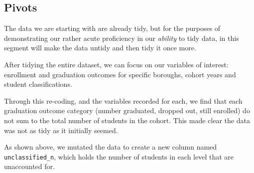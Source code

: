 \documentclass[
  english,
  man, fleqn, noextraspace]{apa6}
\newenvironment{Shaded}{\begin{snugshade}}{\end{snugshade}}
\newcommand{\DataTypeTok}[1]{\textcolor[rgb]{0.13,0.29,0.53}{#1}}
\newcommand{\DecValTok}[1]{\textcolor[rgb]{0.00,0.00,0.81}{#1}}
\newcommand{\KeywordTok}[1]{\textcolor[rgb]{0.13,0.29,0.53}{\textbf{#1}}}
\newcommand{\NormalTok}[1]{#1}
\newcommand{\OperatorTok}[1]{\textcolor[rgb]{0.81,0.36,0.00}{\textbf{#1}}}
\newcommand{\OtherTok}[1]{\textcolor[rgb]{0.56,0.35,0.01}{#1}}
\newcommand{\StringTok}[1]{\textcolor[rgb]{0.31,0.60,0.02}{#1}}
\begin{document}
\hypertarget{pivots}{%
\subsection{Pivots}\label{pivots}}

The data we are starting with are already tidy, but for the purposes of demonstrating our rather acute proficiency in our \emph{ability} to tidy data, in this segment will make the data untidy and then tidy it once more.

\begin{Shaded}
\end{Shaded}

After tidying the entire dataset, we can focus on our variables of interest: enrollment and graduation outcomes for specific boroughs, cohort years and student classifications.

Through this re-coding, and the variables recorded for each, we find that each graduation outcome category (number graduated, dropped out, still enrolled) do not sum to the total number of students in the cohort. This made clear the data was not as tidy as it initially seemed.

As shown above, we mutated the data to create a new column named \texttt{unclassified\_n}, which holds the number of students in each level that are unaccounted for.
\end{document}
